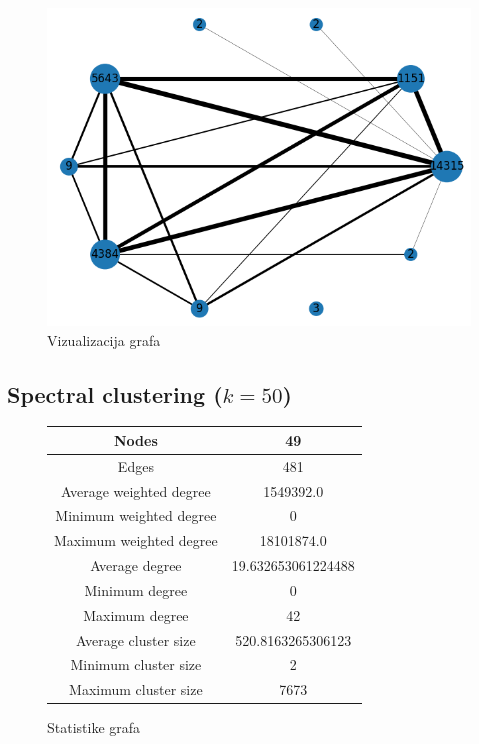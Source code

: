 \documentclass[a4paper,12pt]{article}
\begin{document}
	\begin{figure}[H]
		\centering
		\includegraphics[scale=0.7]{spectral_merged_graph_10_visualization}
		\caption{Vizualizacija grafa}
	\end{figure}


	\subsection{Spectral clustering ($k = 50$)}
	\begin{figure}[H]
		\centering
		\begin{tabular}{ |c|c| } 
			\hline
			Nodes& 49 \\
			\hline
			Edges& 481 \\
			\hline
			Average weighted degree& 1549392.0 \\
			Minimum weighted degree& 0  \\
			Maximum weighted degree& 18101874.0 \\
			\hline
			Average degree& 19.632653061224488 \\
			Minimum degree& 0 \\ 
			Maximum degree& 42 \\
			\hline
			Average cluster size& 520.8163265306123 \\
			Minimum cluster size& 2 \\
			Maximum cluster size& 7673 \\
			\hline
			
		\end{tabular}
		\caption{Statistike grafa}
	\end{figure}
	
\end{document}
